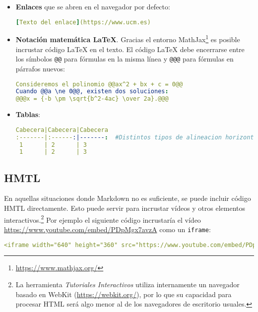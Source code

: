\documentclass[]{article}
\newcommand{\code}[1]{{\lstinline[basicstyle=\ttfamily,mathescape]!#1!}}
\newcommand{\toolname}{\emph{Tutoriales Interactivos}}
\begin{document}
\begin{itemize}
\begin{lstlisting}[language=yaml,numbers=none]
**Imagen desde el directorio de temas, con ruta relativa**
![triangulo](file://img/triangulo.jpg)
\end{lstlisting}		
Todas las imágenes cuya ruta comience con \code{file://} serán consideradas imágenes locales cuya ruta es relativa al directorio donde reside el tema actual. Por ejemplo, si el tema actual reside en <<\code{/opt/temas/Python 3.x}>>, la imagen <<\code{file://img/triangulo.jpg}>> se referirá al fichero situado en <<\code{/opt/temas/Python 3.x/img/triangulo.jpg}>>.
	\item \textbf{Enlaces} que se abren en el navegador por defecto:
\begin{lstlisting}[language=yaml,numbers=none]
[Texto del enlace](https://www.ucm.es)
\end{lstlisting}
	\item \textbf{Notación matemática \LaTeX}. Gracias el entorno MathJax\footnote{\url{https://www.mathjax.org/}} es posible incrustar código \LaTeX{} en el texto. El código \LaTeX{} debe encerrarse entre los símbolos \code{@@} para fórmulas en la misma línea y \code{@@@} para fórmulas en párrafos nuevos:
\begin{lstlisting}[language=yaml,numbers=none]
Consideremos el polinomio @@ax^2 + bx + c = 0@@
Cuando @@a \ne 0@@, existen dos soluciones:
@@@x = {-b \pm \sqrt{b^2-4ac} \over 2a}.@@@	
\end{lstlisting}
	\item \textbf{Tablas}:
\begin{lstlisting}[language=yaml,numbers=none]
Cabecera|Cabecera|Cabecera
:-------|:------:|-------:  #Distintos tipos de alineacion horizontal
 1      | 2      | 3
 1      | 2      | 3
\end{lstlisting}	
\end{itemize}

\subsection{HMTL}
En aquellas situaciones donde Markdown no es suficiente, se puede incluir código HMTL directamente. Esto puede servir para incrustar vídeos y otros elementos interactivos.\footnote{La herramienta \toolname{} utiliza internamente un navegador basado en WebKit (\url{https://webkit.org/}), por lo que su capacidad para procesar HTML será algo menor al de los navegadores de escritorio usuales.} Por ejemplo el siguiente código incrustaría el vídeo \url{https://www.youtube.com/embed/PDpMgx7avzA} como un \code{iframe}:
\begin{lstlisting}[language=yaml,numbers=none]
<iframe width="640" height="360" src="https://www.youtube.com/embed/PDpMgx7avzA" frameborder="0" allowfullscreen target="_self"></iframe>
\end{lstlisting}		
\end{document}
